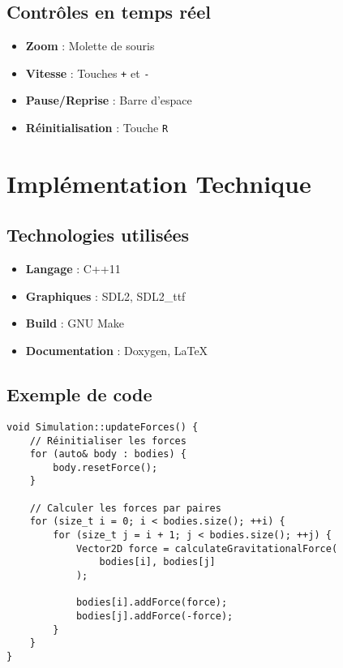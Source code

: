 \documentclass[12pt,a4paper]{article}
\begin{document}
\subsection{Contrôles en temps réel}

\begin{itemize}
    \item \textbf{Zoom} : Molette de souris
    \item \textbf{Vitesse} : Touches \texttt{+} et \texttt{-}
    \item \textbf{Pause/Reprise} : Barre d'espace
    \item \textbf{Réinitialisation} : Touche \texttt{R}
\end{itemize}

\section{Implémentation Technique}

\subsection{Technologies utilisées}

\begin{itemize}
    \item \textbf{Langage} : C++11
    \item \textbf{Graphiques} : SDL2, SDL2\_ttf
    \item \textbf{Build} : GNU Make
    \item \textbf{Documentation} : Doxygen, LaTeX
\end{itemize}

\subsection{Exemple de code}

\begin{lstlisting}[caption=Calcul des forces gravitationnelles]
void Simulation::updateForces() {
    // Réinitialiser les forces
    for (auto& body : bodies) {
        body.resetForce();
    }
    
    // Calculer les forces par paires
    for (size_t i = 0; i < bodies.size(); ++i) {
        for (size_t j = i + 1; j < bodies.size(); ++j) {
            Vector2D force = calculateGravitationalForce(
                bodies[i], bodies[j]
            );
            
            bodies[i].addForce(force);
            bodies[j].addForce(-force);
        }
    }
}
\end{lstlisting}
\end{document}
